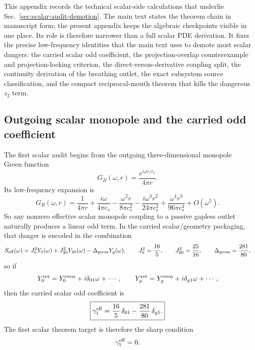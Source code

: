 \documentclass[11pt]{article}
\begin{document}
This appendix records the technical scalar-side calculations that underlie
Sec.~\ref{sec:scalar-audit-demotion}.  The main text states the theorem chain in
manuscript form; the present appendix keeps the algebraic checkpoints visible in
one place.  Its role is therefore narrower than a full scalar PDE derivation.
It fixes the precise low-frequency identities that the main text uses to demote
most scalar dangers: the carried scalar odd coefficient, the projection-overlap
counterexample and projection-locking criterion, the direct-versus-derivative
coupling split, the continuity derivation of the breathing outlet, the exact
subsystem source classification, and the compact reciprocal-mouth theorem that
kills the dangerous $z_2$ term.

\subsection{Outgoing scalar monopole and the carried odd coefficient}
\label{app:scalar-ledger-outgoing}

The first scalar audit begins from the outgoing three-dimensional monopole Green
function
\[
G_R(\omega,r)=\frac{e^{i\omega r/c_s}}{4\pi r}.
\]
Its low-frequency expansion is
\[
G_R(\omega,r)
=
\frac{1}{4\pi r}
+
\frac{i\omega}{4\pi c_s}
-
\frac{\omega^2 r}{8\pi c_s^2}
-
\frac{i\omega^3 r^2}{24\pi c_s^3}
+
\frac{\omega^4 r^3}{96\pi c_s^4}
+
O(\omega^5).
\]
So any nonzero effective scalar monopole coupling to a passive gapless outlet
naturally produces a linear odd term.  In the carried scalar/geometry packaging,
that danger is encoded in the combination
\[
S_{\rm eff}(\omega)
=
J_0^2Y_0(\omega)+J_{20}^2Y_{20}(\omega)-\Delta_{\rm geom}Y_g(\omega),
\qquad
J_0^2=\frac{16}{5},
\qquad
J_{20}^2=\frac{25}{16},
\qquad
\Delta_{\rm geom}=\frac{281}{80},
\]
so if
\[
Y_0^{\rm ret}=Y_0^{\rm even}+i\delta_{01}\omega+\cdots,
\qquad
Y_g^{\rm ret}=Y_g^{\rm even}+i\delta_{g1}\omega+\cdots,
\]
then the carried scalar odd coefficient is
\[
\boxed{
\gamma_1^{\rm eff}
=
\frac{16}{5}\,\delta_{01}-\frac{281}{80}\,\delta_{g1}.
}
\]
The first scalar theorem target is therefore the sharp condition
\[
\gamma_1^{\rm eff}=0.
\]
\end{document}
